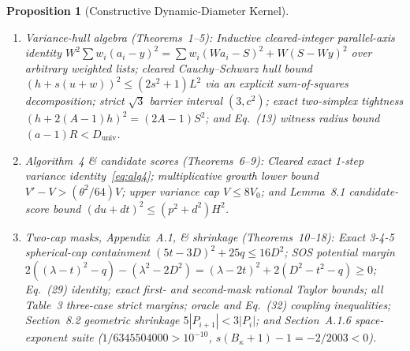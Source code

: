 \documentclass[11pt,twocolumn]{article}
\newtheorem{proposition}{Proposition}
\begin{document}
\begin{proposition}[Constructive Dynamic-Diameter Kernel]\label{prop:lean}
\leavevmode
\begin{enumerate}[leftmargin=*,nosep]
  \item \emph{Variance-hull algebra (Theorems~1--5):} Inductive cleared-integer parallel-axis identity $W^2\sum w_i(a_i-y)^2 = \sum w_i(Wa_i - S)^2 + W(S-Wy)^2$ over arbitrary weighted lists; cleared Cauchy--Schwarz hull bound $(h+s(u+w))^2 \le (2s^2+1)L^2$ via an explicit sum-of-squares decomposition; strict $\sqrt{3}$ barrier interval $(3, c^2)$; exact two-simplex tightness $(h+2(A-1)h)^2 = (2A-1)S^2$; and Eq.~(13) witness radius bound $(a-1)R < D_{\mathrm{univ}}$.
  \item \emph{Algorithm~4 \& candidate scores (Theorems~6--9):} Cleared exact 1-step variance identity~\eqref{eq:alg4}; multiplicative growth lower bound $V'-V > (\theta^2/64)V$; upper variance cap $V \le 8V_0$; and Lemma~8.1 candidate-score bound $(d u + d t)^2 \le (p^2+d^2)H^2$.
  \item \emph{Two-cap masks, Appendix~A.1, \& shrinkage (Theorems~10--18):} Exact 3-4-5 spherical-cap containment $(5t-3D)^2+25q \le 16D^2$; SOS potential margin $2((\lambda-t)^2-q) - (\lambda^2-2D^2) = (\lambda-2t)^2 + 2(D^2-t^2-q) \ge 0$; Eq.~(29) identity; exact first- and second-mask rational Taylor bounds; all Table~3 three-case strict margins; oracle and Eq.~(32) coupling inequalities; Section~8.2 geometric shrinkage $5|P_{i+1}| < 3|P_i|$; and Section~A.1.6 space-exponent suite ($1/6345504000 > 10^{-10}$, $s(B_\kappa+1)-1 = -2/2003 < 0$).
\end{enumerate}
\end{proposition}
\end{document}
